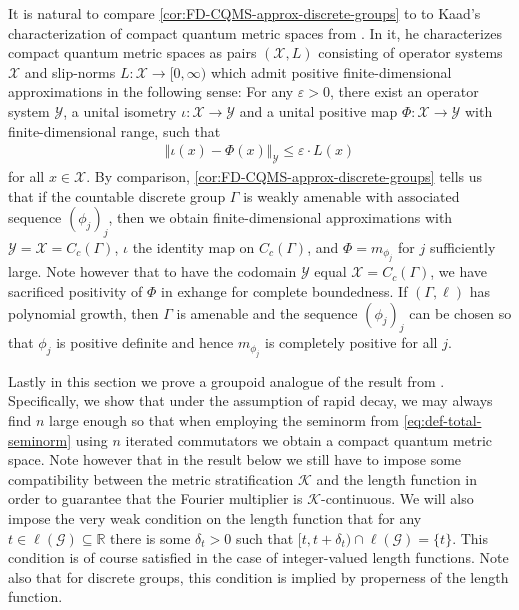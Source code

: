 \documentclass[11pt,a4paper,oneside,final,reqno]{amsart}
\theoremstyle{definition}
\newcommand{\G}{\mathcal{G}}
\newcommand{\cK}{\mathcal{K}}
\newcommand{\cX}{\mathcal{X}}
\newcommand{\cY}{\mathcal{Y}}
\newcommand{\R}{\mathbb{R}}
\numberwithin{equation}{section}
\begin{document}
		It is natural to compare \cref{cor:FD-CQMS-approx-discrete-groups} to to Kaad's characterization of compact quantum metric spaces from \cite[Theorem 3.1]{KaadExternal24}. In it, he characterizes compact quantum metric spaces as pairs $(\cX, L)$ consisting of  operator systems $\cX$ and  slip-norms $L \colon \cX \to [0,\infty)$ which admit positive finite-dimensional approximations in the following sense: For any $\varepsilon >0$, there exist an  operator system $\cY$, a unital isometry $\iota \colon \cX \to \cY$ and a unital positive map $\Phi \colon \cX \to \cY$ with finite-dimensional range, such that 
				\begin{align*}
						\Vert \iota(x) - \Phi(x) \Vert_{\cY} \leq \varepsilon \cdot L(x)
				\end{align*}
		for all $x \in \cX$. By comparison, \cref{cor:FD-CQMS-approx-discrete-groups} tells us that if the countable discrete group $\Gamma$ is weakly amenable with associated sequence $(\phi_j)_j$, then we obtain finite-dimensional approximations with $\cY= \cX = C_c(\Gamma)$, $\iota$ the identity map on $ C_c(\Gamma)$, and $\Phi = m_{\phi_j}$ for $j$ sufficiently large. Note however that to have the codomain $\cY$ equal $\cX = C_c(\Gamma)$, we have sacrificed positivity of $\Phi$ in exhange for complete boundedness. If $(\Gamma, \ell)$ has polynomial growth, then $\Gamma$ is amenable and the sequence $(\phi_j)_j$ can be chosen so that $\phi_j$ is positive definite and hence $m_{\phi_j}$ is completely positive for all $j$. 
		


	
	
	
	Lastly in this section we prove a groupoid analogue of the result from \cite{ChristensenIvanRD}.  Specifically, we show that under the assumption of rapid decay, we may always find $n$ large enough so that when employing the seminorm from \eqref{eq:def-total-seminorm} using $n$ iterated commutators we obtain a compact quantum metric space. Note however that in the result below we still have to impose some compatibility between the metric stratification $\cK$ and the length function in order to guarantee that the Fourier multiplier is $\cK$-continuous. 
	We will also  impose the very weak condition on the length function that for any $t \in \ell(\G) \subseteq \R$ there is some $\delta_t>0$ such that $[t, t+\delta_t) \cap \ell(\G) = \{t\}$. This condition is of course satisfied in the case of integer-valued length functions. Note also that for discrete groups, this condition is implied by properness of the length function. 
	
\end{document}
